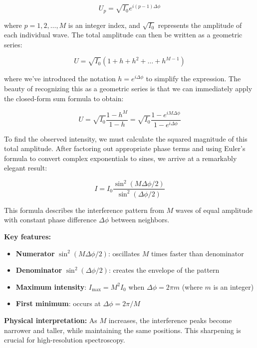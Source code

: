 \documentclass[
  a4paper,
]{book}
\providecommand{\tightlist}{%
  \setlength{\itemsep}{0pt}\setlength{\parskip}{0pt}}
\begin{document}
\[
U_p=\sqrt{I_0}e^{i(p-1)\Delta \phi}
\]

where \(p=1,2,\ldots,M\) is an integer index, and \(\sqrt{I_0}\)
represents the amplitude of each individual wave. The total amplitude
can then be written as a geometric series:

\[
U=\sqrt{I_0}\left (1+h+h^2+\ldots +h^{M-1}\right)
\]

where we've introduced the notation \(h=e^{i\Delta \phi}\) to simplify
the expression. The beauty of recognizing this as a geometric series is
that we can immediately apply the closed-form sum formula to obtain:

\[
U=\sqrt{I_0}\frac{1-h^M}{1-h}=\sqrt{I_0}\frac{1-e^{iM\Delta \phi}}{1-e^{i\Delta \phi}}
\]

To find the observed intensity, we must calculate the squared magnitude
of this total amplitude. After factoring out appropriate phase terms and
using Euler's formula to convert complex exponentials to sines, we
arrive at a remarkably elegant result:

\begin{tcolorbox}[enhanced jigsaw, breakable, toptitle=1mm, bottomrule=.15mm, colbacktitle=quarto-callout-important-color!10!white, title=\textcolor{quarto-callout-important-color}{\faExclamation}\hspace{0.5em}{Multiple Beam Interference Formula (Equal Amplitudes)}, arc=.35mm, rightrule=.15mm, bottomtitle=1mm, opacityback=0, toprule=.15mm, coltitle=black, leftrule=.75mm, opacitybacktitle=0.6, colback=white, left=2mm, titlerule=0mm, colframe=quarto-callout-important-color-frame]

\[I=I_{0}\frac{\sin^2(M\Delta \phi/2)}{\sin^2(\Delta \phi/2)}\]

This formula describes the interference pattern from \(M\) waves of
equal amplitude with constant phase difference \(\Delta \phi\) between
neighbors.

\textbf{Key features:}

\begin{itemize}
\tightlist
\item
  \textbf{Numerator} \(\sin^2(M\Delta \phi/2)\): oscillates \(M\) times
  faster than denominator
\item
  \textbf{Denominator} \(\sin^2(\Delta \phi/2)\): creates the envelope
  of the pattern
\item
  \textbf{Maximum intensity}: \(I_{\text{max}} = M^2 I_0\) when
  \(\Delta \phi = 2\pi m\) (where \(m\) is an integer)
\item
  \textbf{First minimum}: occurs at \(\Delta \phi = 2\pi/M\)
\end{itemize}

\textbf{Physical interpretation:} As \(M\) increases, the interference
peaks become narrower and taller, while maintaining the same positions.
This sharpening is crucial for high-resolution spectroscopy.

\end{tcolorbox}
\end{document}
